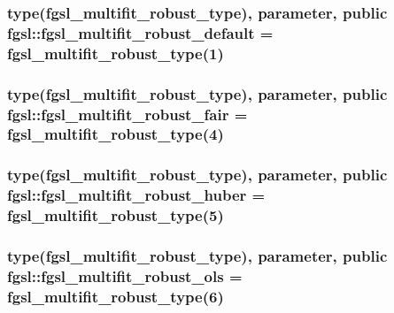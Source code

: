 \hypertarget{classfgsl_ac1a0aa1e007066fb5ae50fcae0e1c885}{
\subsubsection[{fgsl\-\_\-multifit\-\_\-robust\-\_\-default}]{\setlength{\rightskip}{0pt plus 5cm}type({\bf fgsl\-\_\-multifit\-\_\-robust\-\_\-type}), parameter, public fgsl\-::fgsl\-\_\-multifit\-\_\-robust\-\_\-default = {\bf fgsl\-\_\-multifit\-\_\-robust\-\_\-type}(1)}}\label{classfgsl_ac1a0aa1e007066fb5ae50fcae0e1c885}
\hypertarget{classfgsl_a924cc37b78fb66006a7353005347bded}{
\subsubsection[{fgsl\-\_\-multifit\-\_\-robust\-\_\-fair}]{\setlength{\rightskip}{0pt plus 5cm}type({\bf fgsl\-\_\-multifit\-\_\-robust\-\_\-type}), parameter, public fgsl\-::fgsl\-\_\-multifit\-\_\-robust\-\_\-fair = {\bf fgsl\-\_\-multifit\-\_\-robust\-\_\-type}(4)}}\label{classfgsl_a924cc37b78fb66006a7353005347bded}
\hypertarget{classfgsl_a3f232d8677261e46e3b90159cdbe985a}{
\subsubsection[{fgsl\-\_\-multifit\-\_\-robust\-\_\-huber}]{\setlength{\rightskip}{0pt plus 5cm}type({\bf fgsl\-\_\-multifit\-\_\-robust\-\_\-type}), parameter, public fgsl\-::fgsl\-\_\-multifit\-\_\-robust\-\_\-huber = {\bf fgsl\-\_\-multifit\-\_\-robust\-\_\-type}(5)}}\label{classfgsl_a3f232d8677261e46e3b90159cdbe985a}
\hypertarget{classfgsl_a21550651577589ca5adf0cdd17517848}{
\subsubsection[{fgsl\-\_\-multifit\-\_\-robust\-\_\-ols}]{\setlength{\rightskip}{0pt plus 5cm}type({\bf fgsl\-\_\-multifit\-\_\-robust\-\_\-type}), parameter, public fgsl\-::fgsl\-\_\-multifit\-\_\-robust\-\_\-ols = {\bf fgsl\-\_\-multifit\-\_\-robust\-\_\-type}(6)}}\label{classfgsl_a21550651577589ca5adf0cdd17517848}
